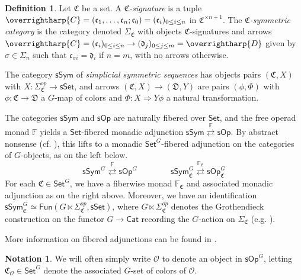 \documentclass[a4paper,10pt
,draft
]{article}%
\numberwithin{equation}{section}
\numberwithin{figure}{section}
\theoremstyle{definition} %
\newtheorem{definition}[equation]{Definition}%
\newtheorem{notation}[equation]{Notation}%
\newcommand{\vect}[1]{\text{\overrightharp{\ensuremath{#1}}}}
\newcommand{\Set}{\ensuremath{\mathsf{Set}}}
\newcommand{\sSet}{\ensuremath{\mathsf{sSet}}}%
\newcommand{\Cat}{\mathsf{Cat}}
\newcommand{\sOp}{\ensuremath{\mathsf{sOp}}}%
\newcommand{\sSym}{\ensuremath{\mathsf{sSym}}}%
\newcommand{\Fun}{\mathsf{Fun}}
\renewcommand{\O}{\ensuremath{\mathcal O}}
\newcommand{\1}{\ensuremath{\mathbbm 1}}%
\begin{document}
\begin{definition}
      Let $\mathfrak C$ be a set. A \textit{$\mathfrak C$-signature} is a tuple
      $\vect C = (\mathfrak c_1, \dots, \mathfrak c_n; \mathfrak c_0) = (\mathfrak c_i)_{0 \leq i \leq n}$ in $\mathfrak C^{\times n+1}$.
      The \textit{$\mathfrak C$-symmetric category} is the category denoted $\Sigma_{\mathfrak C}$ with
      objects $\mathfrak C$-signatures and
      arrows $\vect C = (\mathfrak c_i)_{0 \leq i \leq n} \to (\mathfrak d_j)_{0 \leq j \leq m} = \vect D$
      given by $\sigma \in \Sigma_n$ such that $\mathfrak c_{\sigma i} = \mathfrak d_i$ if $n = m$, with no arrows otherwise.
\end{definition}

The category $\mathsf{sSym}$ of \textit{simplicial symmetric sequences} has
objects pairs $(\mathfrak C, X)$ with $X \colon \Sigma_{\mathfrak C}^{op} \to \sSet$,
and arrows $(\mathfrak C, X) \to (\mathfrak D, Y)$ are pairs $(\phi, \Phi)$ with
$\phi \colon \mathfrak C \to \mathfrak D$ a $G$-map of colors and
$\Phi \colon X \Rightarrow Y \phi$ a natural transformation.

The categories $\sSym$ and $\sOp$ are naturally fibered over $\Set$,
and the free operad monad $\mathbb F$ yields a $\Set$-fibered monadic adjunction
\( \sSym \overset{\mathbb F}{\rightleftarrows} \sOp. \)
By abstract nonsense (cf. \cite[Prop. 2.35]{BP_HGOP}),
this lifts to a monadic $\Set^G$-fibered adjunction on the categories of $G$-objects, as on the left below.
\[
      \sSym^G \overset{\mathbb F}{\rightleftarrows} \sOp^G
      \qquad \qquad
      \sSym^G_{\mathfrak C} \overset{\mathbb F_{\mathfrak C}}{\rightleftarrows} \sOp^G_{\mathfrak C}
\]
For each $\mathfrak C \in \Set^G$, we have a fiberwise monad $\mathbb F_{\mathfrak C}$ and associated monadic adjunction as on the right above.
Moreover, we have an identification \cite[Prop. 2.52]{BP_HGOP}
$\sSym^G_{\mathfrak C} \simeq \Fun(G \ltimes \Sigma_{\mathfrak C}^{op}, \sSet)$, where
$G \ltimes \Sigma_{\mathfrak C}^{op}$ denotes the Grothendieck construction on the functor
$G \to \Cat$ recording the $G$-action on $\Sigma_{\mathfrak C}$ (e.g. \cite[Example 2.13]{BP_HGOP}).

More information on fibered adjunctions can be found in \cite[\S 2.2]{BP_HGOP}.


\begin{notation}
      We will often simply write $\O$ to denote an object in $\sOp^G$,
      letting $\mathfrak C_\O \in \Set^G$ denote the associated $G$-set of colors of $\O$.
\end{notation}
\end{document}

